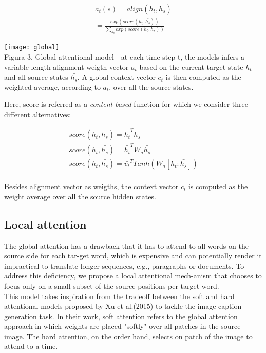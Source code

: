 \begin{gather*}
  a_{t}(s) = align(h_{t},\bar{h_{s}})\\
           = \frac{ exp(score(h_{t},\bar{h_{s}})) }{ \sum_{s_{p}}exp(score(h_{t},h_{s})) }
\end{gather*}

\begin{center}
\texttt{[image: global]} \\%
    Figura 3. Global attentional model - at each time step t, the models infers a variable-length
    alignment weigth vector $a_{t}$ based on the current target state $h_{t}$ and all source states
    $\bar{h_{s}}$. A global context vector $c_{t}$ is then computed as the weighted average, according to $a_{t}$, over all the source states.
\end{center}

Here, score is referred as a \textit{content-based} function for which we consider three different alternatives:

\begin{gather*}
    score(h_{t},\bar{h_{s}}) =  \bar{h_{t}}^T \bar{h_{s}}       \\
    score(h_{t},\bar{h_{s}}) =  \bar{h_{t}}^T W_{a}\bar{h_{s}}   \\ 
    score(h_{t},\bar{h_{s}}) = \bar{v_{t}}^T Tanh( W_{a}[h_{t}:\bar{h_{s}}] )  \\
\end{gather*}

Besides alignment vector as weigths, the context vector $c_{t}$ is computed as the weight average over all the source
hidden states.



\subsection{Local attention}
The global attention has a drawback that it has to
attend to all words on the source side for each tar-get word, which is expensive and can potentially
render it impractical to translate longer sequences, e.g.,  paragraphs  or  documents.   To  address  this
deficiency,  we propose  a local attentional  mech-anism that chooses to focus only on a small subset
of the source positions per target word. \\

This model takes inspiration from the tradeoff between the soft and hard attentional models proposed
by Xu et al.(2015) to tackle the image caption generation task. In their work, soft attention refers
to the global attention approach in which weights are placed "softly" over all patches in the source
image. The hard attention, on the order hand, selects on patch of the image to attend to a time.



